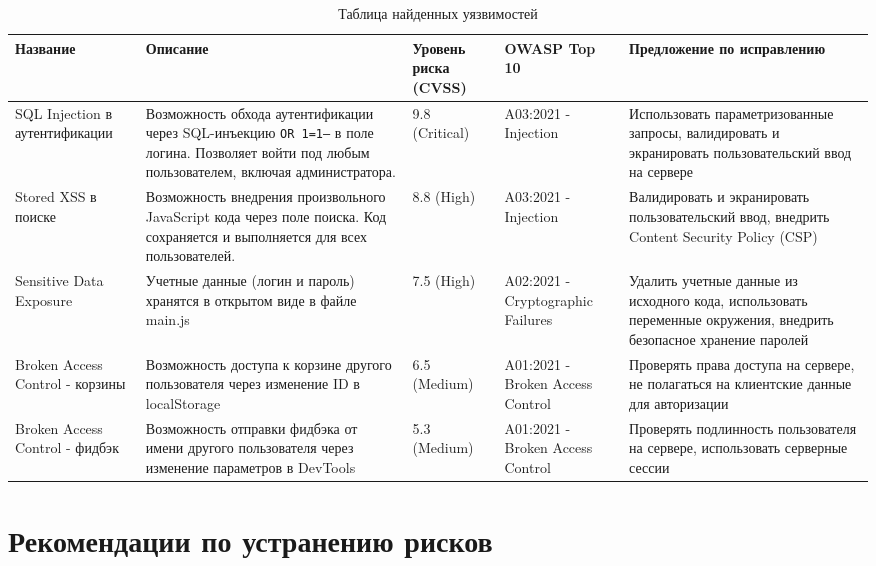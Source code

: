 \documentclass{article}
\begin{document}
\begin{table}[h!]
\centering
\small
\begin{tabular}{|p{2.5cm}|p{3.5cm}|p{1.5cm}|p{2cm}|p{3.5cm}|}
\hline
\textbf{Название} & \textbf{Описание} & \textbf{Уровень риска (CVSS)} & \textbf{OWASP Top 10} & \textbf{Предложение по исправлению} \\
\hline
SQL Injection в аутентификации & Возможность обхода аутентификации через SQL-инъекцию \texttt{OR 1=1--} в поле логина. Позволяет войти под любым пользователем, включая администратора. & 9.8 (Critical) & A03:2021 - Injection & Использовать параметризованные запросы, валидировать и экранировать пользовательский ввод на сервере \\
\hline
Stored XSS в поиске & Возможность внедрения произвольного JavaScript кода через поле поиска. Код сохраняется и выполняется для всех пользователей. & 8.8 (High) & A03:2021 - Injection & Валидировать и экранировать пользовательский ввод, внедрить Content Security Policy (CSP) \\
\hline
Sensitive Data Exposure & Учетные данные (логин и пароль) хранятся в открытом виде в файле main.js & 7.5 (High) & A02:2021 - Cryptographic Failures & Удалить учетные данные из исходного кода, использовать переменные окружения, внедрить безопасное хранение паролей \\
\hline
Broken Access Control - корзины & Возможность доступа к корзине другого пользователя через изменение ID в localStorage & 6.5 (Medium) & A01:2021 - Broken Access Control & Проверять права доступа на сервере, не полагаться на клиентские данные для авторизации \\
\hline
Broken Access Control - фидбэк & Возможность отправки фидбэка от имени другого пользователя через изменение параметров в DevTools & 5.3 (Medium) & A01:2021 - Broken Access Control & Проверять подлинность пользователя на сервере, использовать серверные сессии \\
\hline
\end{tabular}
\caption{Таблица найденных уязвимостей}
\end{table}

\section{Рекомендации по устранению рисков}
\end{document}
